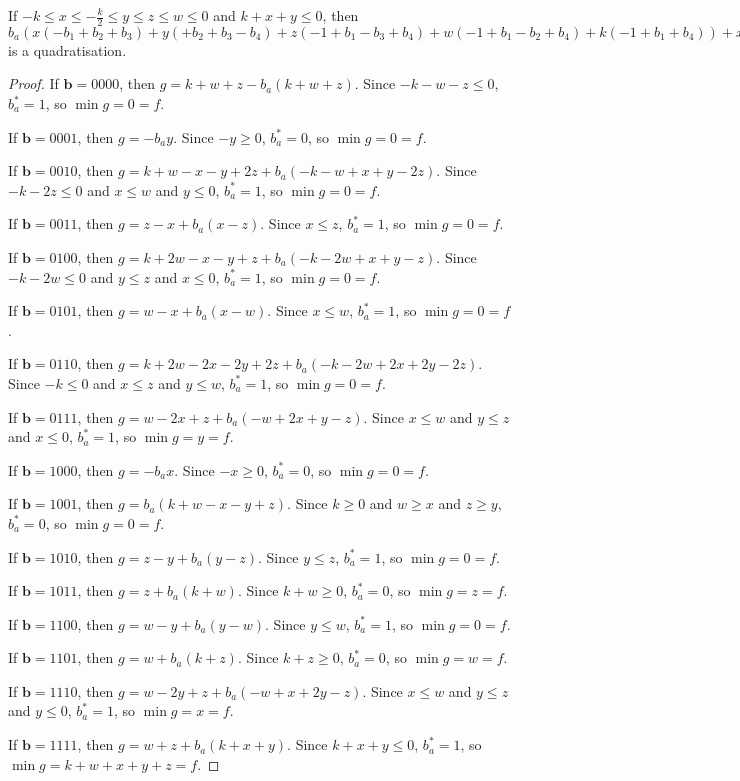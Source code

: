 \documentclass[11pt]{scrartcl}
\newcommand{\vc}[1]{\boldsymbol{#1}}
\begin{document}
\begin{lemma}
 If $-k\le x \le -\frac{k}{2} \le y \le z \le w \le 0$ and $k+x+y \le 0$, then $b_a(x(-b_1+b_2+b_3)+y(+b_2+b_3-b_4)+z(-1+b_1-b_3+b_4)+w(-1+b_1-b_2+b_4)+k(-1+b_1+b_4))+x(-b_2-b_3+b_1b_2+b_1b_3)+y(-b_2-b_3+b_2b_4+b_3b_4)+z(+1 -b_1+b_3-b_4+b_1b_4)+w(+1 -b_1+b_2-b_4+b_1b_4)+k(+1 -b_1-b_4+b_1b_4)$ is a quadratisation.\\
 \end{lemma}

\begin{proof}
If $\vc b = 0000$, then $g = k + w + z - b_a(k + w + z)$.
Since $-k - w - z \le 0$, $b_a^* = 1$, so $\min g = 0 = f$.

If $\vc b = 0001$, then $g = -b_ay$.
Since $-y \ge 0$, $b_a^* = 0 $, so $\min g = 0 = f$.

If $\vc b = 0010$, then $g = k + w - x - y + 2z + b_a(-k - w + x + y - 2z)$.
Since $-k - 2z \le 0$ and $x \le w$ and $ y \le 0$, $b_a^* = 1$, so $\min g = 0 = f$.

If $\vc b = 0011$, then $g = z - x + b_a(x - z)$.
Since $x \le z$, $b_a^* = 1$, so $\min g = 0 = f$.

If $\vc b = 0100$, then $g = k + 2w - x - y + z + b_a(-k - 2w + x + y - z)$.
Since $-k - 2w \le 0$ and $y \le z$ and $x \le 0$, $b_a^* = 1$, so $\min g = 0 = f$.

If $\vc b = 0101$, then $g = w - x + b_a(x - w)$.
Since $x \le w$, $b_a^* = 1$, so $\min g = 0 = f$.

If $\vc b = 0110$, then $g = k + 2w - 2x - 2y + 2z + b_a(-k -2w + 2x + 2y - 2z)$.
Since $-k \le 0$ and $x \le z$ and $y \le w$, $b_a^* = 1$, so $\min g = 0 = f$.

If $\vc b = 0111$, then $g = w - 2x + z + b_a(-w + 2x + y - z)$.
Since $x \le w$ and $y \le z$ and $x \le 0$, $b_a^* = 1$, so $\min g = y = f$.

If $\vc b = 1000$, then $g = -b_ax$.
Since $-x \ge 0$, $b_a^* = 0$, so $\min g = 0 = f$.

If $\vc b = 1001$, then $g = b_a(k + w - x - y + z)$.
Since $k \ge 0$ and $w \ge x $ and $z \ge y$, $b_a^* = 0$, so $\min g = 0 = f$.

If $\vc b = 1010$, then $g = z - y + b_a(y - z)$.
Since $y \le z$, $b_a^* = 1$, so $\min g = 0 = f$.

If $\vc b = 1011$, then $g = z + b_a(k + w)$.
Since $k + w \ge 0$, $b_a^* = 0$, so $\min g = z = f$.

If $\vc b = 1100$, then $g = w - y + b_a(y -w)$.
Since $y \le w$, $b_a^* = 1$, so $\min g = 0 = f$.

If $\vc b = 1101$, then $g = w + b_a(k + z)$.
Since $k+z \ge 0$, $b_a^* = 0 $, so $\min g = w = f$.

If $\vc b = 1110$, then $g = w - 2y + z + b_a(-w + x + 2y - z)$.
Since $x \le w$ and $ y \le z$ and $y \le 0$, $b_a^* = 1$, so $\min g = x =f $.

If $\vc b = 1111$, then $g = w + z + b_a(k + x + y)$.
Since $k+x + y \le 0$, $b_a^* = 1$, so $\min g = k + w + x + y + z = f$.
\end{proof}
\end{document}
